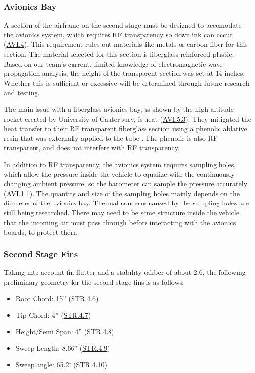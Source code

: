 \subsubsection{Avionics Bay}
A section of the airframe on the second stage must be designed to accomodate the avionics system, which requires RF transparency so downlink can occur (\hyperlink{AVI.4}{AVI.4}). This requirement rules out materials like metals or carbon fiber for this section. The material selected for this section is fiberglass reinforced plastic. Based on our team's current, limited knowledge of electromagnetic wave propagation analysis, the height of the transparent section was set at 14 inches. Whether this is sufficient or excessive will be determined through future research and testing.

The main issue with a fiberglass avionics bay, as shown by the high altitude rocket created by University of Canterbury, is heat (\hyperlink{AVI.5.3}{AVI.5.3}). They mitigated the heat transfer to their RF transparent fiberglass section using a phenolic ablative resin that was externally applied to the tube \cite{into-black}. The phenolic is also RF transparent, and does not interfere with RF transparency.

In addition to RF transparency, the avionics system requires sampling holes, which allow the pressure inside the vehicle to equalize with the continuously changing ambient pressure, so the barometer can sample the pressure accurately (\hyperlink{AVI.1.1}{AVI.1.1}). The quantity and size of the sampling holes mainly depends on the diameter of the avionics bay. Thermal concerns caused by the sampling holes are still being researched. There may need to be some structure inside the vehicle that the incoming air must pass through before interacting with the avionics boards, to protect them. 


\subsubsection{Second Stage Fins}
Taking into account fin flutter and a stability caliber of about 2.6, the following preliminary geometry for the second stage fins is as follows:

\begin{itemize}
    \item Root Chord: 15'' (\hyperlink{STR.4.6}{STR.4.6})
    \item Tip Chord: 4'' (\hyperlink{STR.4.7}{STR.4.7})
    \item Height/Semi Span: 4'' (\hyperlink{STR.4.8}{STR.4.8})
    \item Sweep Length: 8.66'' (\hyperlink{STR.4.9}{STR.4.9})
    \item Sweep angle: 65.2\(^\circ\) (\hyperlink{STR.4.10}{STR.4.10})
\end{itemize}

